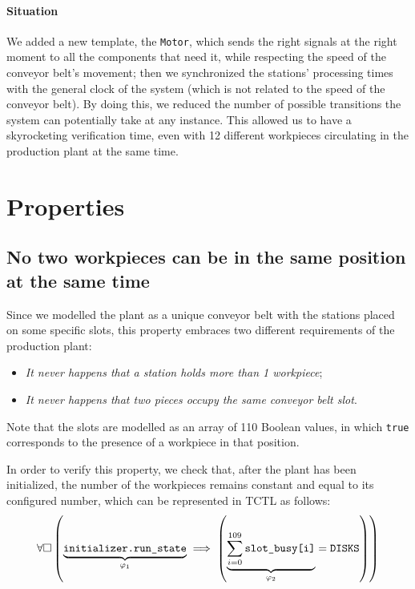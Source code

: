 \documentclass[a4paper]{article}
\newcommand{\formulacomment}[2]{\underset{\varphi_{#1}}{\underbrace{#2}}}
\newcommand{\formulatext}[1]{\text{\texttt{#1}}}
\begin{document}
    \paragraph{Situation} We added a new template, the \texttt{Motor}, which sends the right signals at the right moment to all the components that need it, while respecting the speed of the conveyor belt's movement; then we synchronized the stations' processing times with the general clock of the system (which is not related to the speed of the conveyor belt). By doing this, we reduced the number of possible transitions the system can potentially take at any instance. This allowed us to have a skyrocketing verification time, even with 12 different workpieces circulating in the production plant at the same time.

    \section{Properties}

    \subsection{No two workpieces can be in the same position at the same time} \label{property:1-2}

    Since we modelled the plant as a unique conveyor belt with the stations placed on some specific slots, this property embraces two different requirements of the production plant:
    \begin{itemize}
        \item \textit{It never happens that a station holds more than 1 workpiece};
        \item \textit{It never happens that two pieces occupy the same conveyor belt slot}.
    \end{itemize}

    Note that the slots are modelled as an array of 110 Boolean values, in which \texttt{true} corresponds to the presence of a workpiece in that position.\medskip

    In order to verify this property, we check that, after the plant has been initialized, the number of the workpieces remains constant and equal to its configured number, which can be represented in TCTL as follows:
    \[\forall \square \left(\formulacomment{1}{\formulatext{initializer.run\_state}} \implies \left(\formulacomment{2}{\sum_{i = 0}^{109} \formulatext{slot\_busy[i]}} = \formulatext{DISKS}\right)\right)\]
\end{document}
